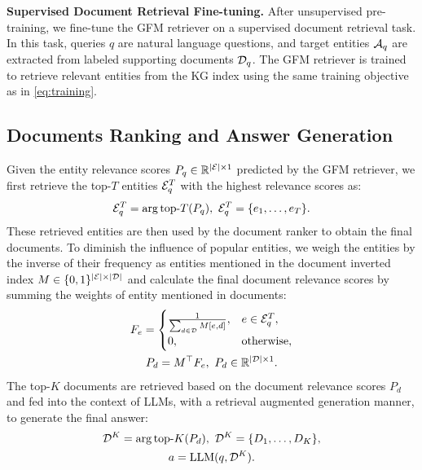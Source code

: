 \noindent\textbf{Supervised Document Retrieval Fine-tuning.} After unsupervised pre-training, we fine-tune the GFM retriever on a supervised document retrieval task. In this task, queries $q$ are natural language questions, and target entities ${\mathcal{A}}_q$ are extracted from labeled supporting documents ${\mathcal{D}}_q$. The GFM retriever is trained to retrieve relevant entities from the KG index using the same training objective as in \eqref{eq:training}. 

\subsection{Documents Ranking and Answer Generation}\label{sec:ranking}
Given the entity relevance scores $P_q\in{\mathbb{R}}^{|{\mathcal{E}}|\times 1}$ predicted by the GFM retriever, we first retrieve the top-$T$ entities ${\mathcal{E}}_q^{T}$ with the highest relevance scores as:
\begin{equation}
    {\mathcal{E}}_q^{T} = \arg\text{top-}T(P_q),~{\mathcal{E}}_q^{T}=\{e_1,\ldots,e_T\}.
\end{equation}
These retrieved entities are then used by the document ranker to obtain the final documents. To diminish the influence of popular entities, we weigh the entities by the inverse of their frequency as entities mentioned in the document inverted index $M \in \{0,1\}^{|{\mathcal{E}}|\times|{\mathcal{D}}|}$ and calculate the final document relevance scores by summing the weights of entity mentioned in documents:
{
\begin{gather}
    \setlength\abovedisplayskip{2pt}%
    \setlength\belowdisplayskip{2pt}
    F_e = \begin{cases}
        \frac{1}{\sum_{d\in\gD} M[e,d]}, & e\in\gE_q^{T}, \\
        0, & \text{otherwise},
    \end{cases} \\
    P_d = M^{\top}F_e,~P_d\in\sR^{|\gD|\times 1}.
\end{gather}
The top-$K$ documents are retrieved based on the document relevance scores $P_d$ and fed into the context of LLMs, with a retrieval augmented generation manner, to generate the final answer:
\begin{gather}
    \setlength\abovedisplayskip{1pt}%
    \setlength\belowdisplayskip{1pt}
    \gD^K = \arg\text{top-}K(P_d),~\gD^K=\{D_1,\ldots,D_K\}, \\
    a = \text{LLM}(q,\gD^K).
\end{gather}
}